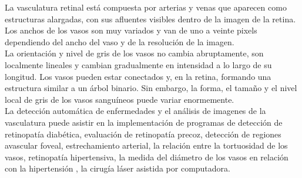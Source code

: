 La vasculatura retinal está compuesta por arterias y venas que aparecen como estructuras alargadas, con sus afluentes visibles dentro de la imagen de la retina.
Los anchos de los vasos son muy variados y van de uno a veinte pixels dependiendo del ancho del vaso y de la resolución de la imagen.
\\
La orientación y nivel de gris de los vasos no cambia abruptamente, son localmente lineales y cambian gradualmente en intensidad a lo largo de su longitud. Los vasos pueden estar conectados y, en la retina, formando una estructura similar a un árbol binario. Sin embargo, la forma, el tamaño y el nivel local de gris de los vasos sanguíneos puede variar enormemente.
\\
La detección automática de enfermedades y el análisis de imagenes de la vasculatura   puede asistir en la implementación de programas de detección de retinopatía diabética, evaluación de retinopatía precoz, detección de regiones avascular foveal, estrechamiento arterial, la relación entre la tortuosidad de los vasos, retinopatía hipertensiva, la medida del diámetro de los vasos en relación con la hipertensión , la cirugía láser asistida por computadora.\cite{fraz2012blood}\\


